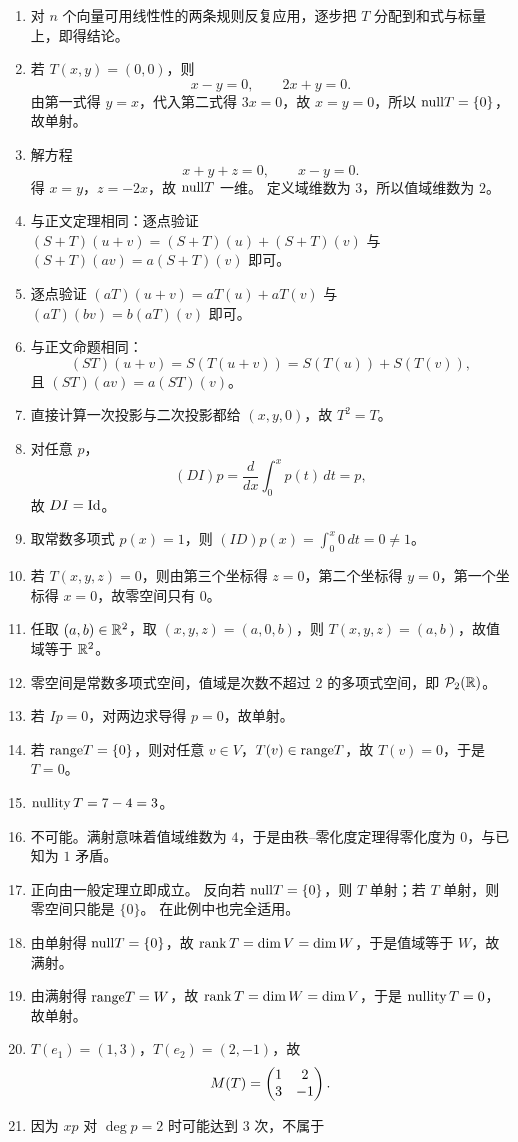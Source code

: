 \begin{enumerate}[label=\medium\ \arabic*., leftmargin=*] \item 对 $n$
个向量可用线性性的两条规则反复应用，逐步把 $T$ 分配到和式与标量上，即得结论。 \item 若 $T(x,y)=(0,0)$，则 \[ x-y=0,\qquad
2x+y=0. \] 由第一式得 $y=x$，代入第二式得 $3x=0$，故 $x=y=0$，所以 $\mathrm{null} T=\{0\}$，故单射。 \item 解方程 \[
x+y+z=0,\qquad x-y=0. \] 得 $x=y$，$z=-2x$，故 $\mathrm{null} T$ 一维。 定义域维数为 $3$，所以值域维数为 $2$。 \item
与正文定理相同：逐点验证 $(S+T)(u+v)=(S+T)(u)+(S+T)(v)$ 与 $(S+T)(av)=a(S+T)(v)$ 即可。 \item 逐点验证
$(aT)(u+v)=aT(u)+aT(v)$ 与 $(aT)(bv)=b(aT)(v)$ 即可。 \item 与正文命题相同： \[
(ST)(u+v)=S(T(u+v))=S(T(u))+S(T(v)), \] 且 $(ST)(av)=a(ST)(v)$。 \item 直接计算一次投影与二次投影都给
$(x,y,0)$，故 $T^2=T$。 \item 对任意 $p$， \[ (DI)p=\frac{d}{dx}\int_0^x p(t)\,dt=p, \] 故
$DI=\mathrm{Id}$。 \item 取常数多项式 $p(x)=1$，则 $(ID)p(x)=\int_0^x 0\,dt=0\neq 1$。 \item 若
$T(x,y,z)=0$，则由第三个坐标得 $z=0$，第二个坐标得 $y=0$，第一个坐标得 $x=0$，故零空间只有 $0$。 \item 任取
$(a,b)\in\mathbb{R}^2$，取 $(x,y,z)=(a,0,b)$，则 $T(x,y,z)=(a,b)$，故值域等于 $\mathbb{R}^2$。 \item
零空间是常数多项式空间，值域是次数不超过 $2$ 的多项式空间，即 $\mathcal{P}_2(\mathbb{R})$。 \item 若 $Ip=0$，对两边求导得 $p=0$，故单射。 \item
若 $\mathrm{range} T=\{0\}$，则对任意 $v\in V$，$T(v)\in\mathrm{range} T$，故 $T(v)=0$，于是 $T=0$。 \item $\operatorname{nullity}
T=7-4=3$。 \item 不可能。满射意味着值域维数为 $4$，于是由秩--零化度定理得零化度为 $0$，与已知为 $1$ 矛盾。 \item 正向由一般定理立即成立。
反向若 $\mathrm{null} T=\{0\}$，则 $T$ 单射；若 $T$ 单射，则零空间只能是 $\{0\}$。 在此例中也完全适用。 \item 由单射得 $\mathrm{null}
T=\{0\}$，故 $\operatorname{rank} T=\dim V=\dim W$，于是值域等于 $W$，故满射。 \item 由满射得 $\mathrm{range} T=W$，故 $\operatorname{rank}
T=\dim W=\dim V$，于是 $\operatorname{nullity} T=0$，故单射。 \item $T(e_1)=(1,3)$，$T(e_2)=(2,-1)$，故 \[
M(T)=\begin{pmatrix} 1 & 2\\ 3 & -1 \end{pmatrix}. \] \item 因为 $xp$ 对 $\deg p=2$ 时可能达到 $3$ 次，不属于

\end{enumerate}
